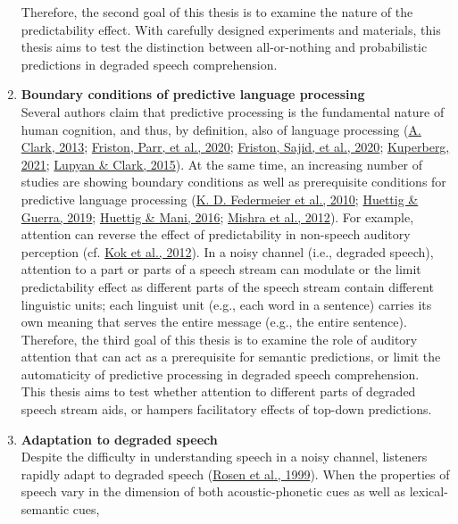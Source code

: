 \documentclass[a4paper, nobind]{templates/ociamthesis}
\begin{document}
\begin{enumerate}
  Therefore, the second goal of this thesis is to examine the nature of the predictability effect.
  With carefully designed experiments and materials, this thesis aims to test the distinction between all-or-nothing and probabilistic predictions in degraded speech comprehension.
\item
  \textbf{Boundary conditions of predictive language processing}\\
  Several authors claim that predictive processing is the fundamental nature of human cognition, and thus, by definition, also of language processing (\protect\hyperlink{ref-Clark2013}{A. Clark, 2013}; \protect\hyperlink{ref-Friston2020}{Friston, Parr, et al., 2020}; \protect\hyperlink{ref-Friston2020b}{Friston, Sajid, et al., 2020}; \protect\hyperlink{ref-Kuperberg2020}{Kuperberg, 2021}; \protect\hyperlink{ref-Lupyan2015}{Lupyan \& Clark, 2015}).
  At the same time, an increasing number of studies are showing boundary conditions as well as prerequisite conditions for predictive language processing (\protect\hyperlink{ref-Federmeier2010}{K. D. Federmeier et al., 2010}; \protect\hyperlink{ref-Huettig2019}{Huettig \& Guerra, 2019}; \protect\hyperlink{ref-Huettig2016}{Huettig \& Mani, 2016}; \protect\hyperlink{ref-Mishra2012}{Mishra et al., 2012}).
  For example, attention can reverse the effect of predictability in non-speech auditory perception (cf. \protect\hyperlink{ref-Kok2012}{Kok et al., 2012}).
  In a noisy channel (i.e., degraded speech), attention to a part or parts of a speech stream can modulate or the limit predictability effect as different parts of the speech stream contain different linguistic units;
  each linguist unit (e.g., each word in a sentence) carries its own meaning that serves the entire message (e.g., the entire sentence).
  Therefore, the third goal of this thesis is to examine the role of auditory attention that can act as a prerequisite for semantic predictions,
  or limit the automaticity of predictive processing in degraded speech comprehension.\\
  This thesis aims to test whether attention to different parts of degraded speech stream aids, or hampers facilitatory effects of top-down predictions.
\item
  \textbf{Adaptation to degraded speech}\\
  Despite the difficulty in understanding speech in a noisy channel,
  listeners rapidly adapt to degraded speech (\protect\hyperlink{ref-Rosen1999}{Rosen et al., 1999}).
  When the properties of speech vary in the dimension of both acoustic-phonetic cues as well as lexical-semantic cues,

\end{enumerate}
\end{document}
